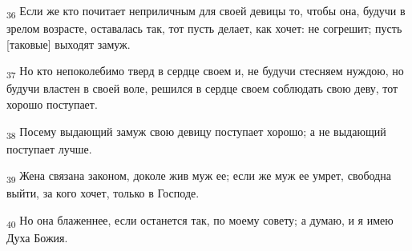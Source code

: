 \begin{tcolorbox}
\textsubscript{36} Если же кто почитает неприличным для своей девицы то, чтобы она, будучи в зрелом возрасте, оставалась так, тот пусть делает, как хочет: не согрешит; пусть [таковые] выходят замуж.
\end{tcolorbox}
\begin{tcolorbox}
\textsubscript{37} Но кто непоколебимо тверд в сердце своем и, не будучи стесняем нуждою, но будучи властен в своей воле, решился в сердце своем соблюдать свою деву, тот хорошо поступает.
\end{tcolorbox}
\begin{tcolorbox}
\textsubscript{38} Посему выдающий замуж свою девицу поступает хорошо; а не выдающий поступает лучше.
\end{tcolorbox}
\begin{tcolorbox}
\textsubscript{39} Жена связана законом, доколе жив муж ее; если же муж ее умрет, свободна выйти, за кого хочет, только в Господе.
\end{tcolorbox}
\begin{tcolorbox}
\textsubscript{40} Но она блаженнее, если останется так, по моему совету; а думаю, и я имею Духа Божия.
\end{tcolorbox}
